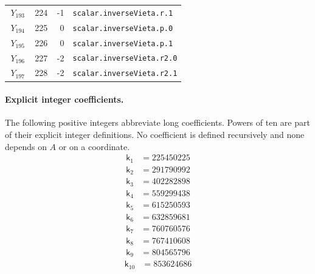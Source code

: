 {\begin{longtable}{@{}r r r p{0.64\linewidth}@{}}
\(Y_{193}\) & 224 & -1 & \texttt{scalar.\allowbreak{}inverseVieta.\allowbreak{}r.\allowbreak{}1} \\
\(Y_{194}\) & 225 & 0 & \texttt{scalar.\allowbreak{}inverseVieta.\allowbreak{}p.\allowbreak{}0} \\
\(Y_{195}\) & 226 & 0 & \texttt{scalar.\allowbreak{}inverseVieta.\allowbreak{}p.\allowbreak{}1} \\
\(Y_{196}\) & 227 & -2 & \texttt{scalar.\allowbreak{}inverseVieta.\allowbreak{}r2.\allowbreak{}0} \\
\(Y_{197}\) & 228 & -2 & \texttt{scalar.\allowbreak{}inverseVieta.\allowbreak{}r2.\allowbreak{}1} \\
\end{longtable}
}
\paragraph{Explicit integer coefficients.}
The following positive integers abbreviate long coefficients.  Powers
of ten are part of their explicit integer definitions.  No coefficient
is defined recursively and none depends on $A$ or on a coordinate.
\[
\begin{aligned}
\mathsf{k}_{1} &={} 225450225
\end{aligned}
\]
\[
\begin{aligned}
\mathsf{k}_{2} &={} 291790992
\end{aligned}
\]
\[
\begin{aligned}
\mathsf{k}_{3} &={} 402282898
\end{aligned}
\]
\[
\begin{aligned}
\mathsf{k}_{4} &={} 559299438
\end{aligned}
\]
\[
\begin{aligned}
\mathsf{k}_{5} &={} 615250593
\end{aligned}
\]
\[
\begin{aligned}
\mathsf{k}_{6} &={} 632859681
\end{aligned}
\]
\[
\begin{aligned}
\mathsf{k}_{7} &={} 760760576
\end{aligned}
\]
\[
\begin{aligned}
\mathsf{k}_{8} &={} 767410608
\end{aligned}
\]
\[
\begin{aligned}
\mathsf{k}_{9} &={} 804565796
\end{aligned}
\]
\[
\begin{aligned}
\mathsf{k}_{10} &={} 853624686
\end{aligned}
\]
